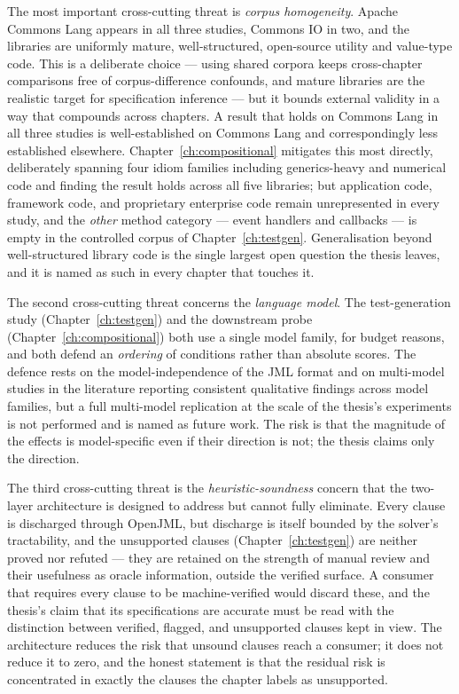 The most important cross-cutting threat is \emph{corpus homogeneity}. Apache
Commons Lang appears in all three studies, Commons IO in two, and the libraries
are uniformly mature, well-structured, open-source utility and value-type code.
This is a deliberate choice --- using shared corpora keeps cross-chapter
comparisons free of corpus-difference confounds, and mature libraries are the
realistic target for specification inference --- but it bounds external validity
in a way that compounds across chapters. A result that holds on Commons Lang in
all three studies is well-established on Commons Lang and correspondingly less
established elsewhere. Chapter~\ref{ch:compositional} mitigates this most
directly, deliberately spanning four idiom families including generics-heavy and
numerical code and finding the result holds across all five libraries; but
application code, framework code, and proprietary enterprise code remain
unrepresented in every study, and the \emph{other} method category --- event
handlers and callbacks --- is empty in the controlled corpus of
Chapter~\ref{ch:testgen}. Generalisation beyond well-structured library code is
the single largest open question the thesis leaves, and it is named as such in
every chapter that touches it.

The second cross-cutting threat concerns the \emph{language model}. The
test-generation study (Chapter~\ref{ch:testgen}) and the downstream probe
(Chapter~\ref{ch:compositional}) both use a single model family, for budget
reasons, and both defend an \emph{ordering} of conditions rather than absolute
scores. The defence rests on the model-independence of the JML format and on
multi-model studies in the literature reporting consistent qualitative findings
across model families, but a full multi-model replication at the scale of the
thesis's experiments is not performed and is named as future work. The risk is
that the magnitude of the effects is model-specific even if their direction is
not; the thesis claims only the direction.

The third cross-cutting threat is the \emph{heuristic-soundness} concern that the
two-layer architecture is designed to address but cannot fully eliminate. Every
clause is discharged through OpenJML, but discharge is itself bounded by the
solver's tractability, and the unsupported clauses (Chapter~\ref{ch:testgen}) are
neither proved nor refuted --- they are retained on the strength of manual review
and their usefulness as oracle information, outside the verified surface. A
consumer that requires every clause to be machine-verified would discard these,
and the thesis's claim that its specifications are accurate must be read with the
distinction between verified, flagged, and unsupported clauses kept in view. The
architecture reduces the risk that unsound clauses reach a consumer; it does not
reduce it to zero, and the honest statement is that the residual risk is
concentrated in exactly the clauses the chapter labels as unsupported.

